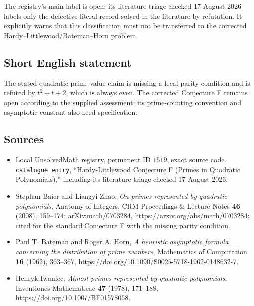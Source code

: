 \documentclass[11pt]{article}
\begin{document}
The registry's main label is open; its literature triage checked 17 August 2026 labels only the defective literal record solved in the literature by refutation. It explicitly warns that this classification must not be transferred to the corrected Hardy--Littlewood/Bateman--Horn problem.
\subsection{Short English statement}
The stated quadratic prime-value claim is missing a local parity condition and is refuted by $t^2+t+2$, which is always even. The corrected Conjecture F remains open according to the supplied assessment; its prime-counting convention and asymptotic constant also need specification.
\subsection{Sources}
\begin{itemize}
\item Local UnsolvedMath registry, permanent ID $1519$, exact source code \texttt{catalogue entry}, ``Hardy-Littlewood Conjecture F (Primes in Quadratic Polynomials),'' including its literature triage checked 17 August 2026.
\item Stephan Baier and Liangyi Zhao, \emph{On primes represented by quadratic polynomials}, Anatomy of Integers, CRM Proceedings \& Lecture Notes \textbf{46} (2008), 159--174; arXiv:math/0703284, \url{https://arxiv.org/abs/math/0703284}; cited for the standard Conjecture F with the missing parity condition.
\item Paul T. Bateman and Roger A. Horn, \emph{A heuristic asymptotic formula concerning the distribution of prime numbers}, Mathematics of Computation \textbf{16} (1962), 363--367, \url{https://doi.org/10.1090/S0025-5718-1962-0148632-7}.
\item Henryk Iwaniec, \emph{Almost-primes represented by quadratic polynomials}, Inventiones Mathematicae \textbf{47} (1978), 171--188, \url{https://doi.org/10.1007/BF01578068}.
\end{itemize}
\end{document}
